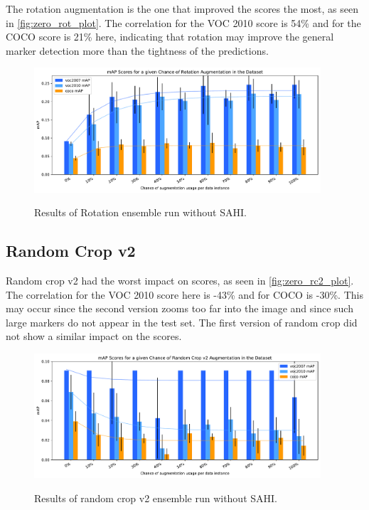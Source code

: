 \documentclass[10pt]{book}
\newcommand{\figureref}[1]{\autoref{#1}}
\begin{document}
The rotation augmentation is the one that improved the scores the most, as seen in \figureref{fig:zero_rot_plot}. The correlation for the VOC 2010 score is 54\% and for the \ac{COCO} score is 21\% here, indicating that rotation may improve the general marker detection more than the tightness of the predictions. %

\begin{figure}
  \caption{Results of Rotation ensemble run without \ac{SAHI}.}
  \includegraphics[width=0.95\textwidth]{image/zero-based-rot-ensemble-2-thesis-2}
  \label{fig:zero_rot_plot}
\end{figure}


\subsection{Random Crop v2}

Random crop v2 had the worst impact on scores, as seen in \figureref{fig:zero_rc2_plot}. The correlation for the VOC 2010 score here is -43\% and for \ac{COCO} is -30\%. This may occur since the second version zooms too far into the image and since such large markers do not appear in the test set. The first version of random crop did not show a similar impact on the scores.

\begin{figure}
  \caption{Results of random crop v2 ensemble run without \ac{SAHI}.}
  \includegraphics[width=0.95\textwidth]{image/zero-based-rc2-ensemble-2-thesis-2}
  \label{fig:zero_rc2_plot}
\end{figure}
\end{document}
